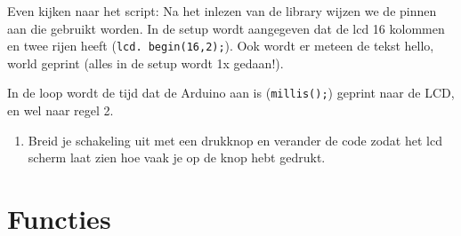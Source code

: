 \documentclass{arduino}
\begin{document}
\begin{minipage}{\widemargin}
Even kijken naar het script: Na het inlezen van de library wijzen we de pinnen aan die gebruikt worden. In de setup wordt aangegeven dat de lcd 16 kolommen en twee rijen heeft (\lstinline{lcd. begin(16,2);}). Ook wordt er meteen de tekst hello, world geprint (alles in de setup wordt 1x gedaan!).

In de loop wordt de tijd dat de Arduino aan is (\lstinline{millis();}) geprint naar de LCD, en wel naar regel 2.

\begin{enumerate}[label={\alph*})]
\item Breid je schakeling uit met een drukknop en verander de code zodat het lcd scherm laat zien hoe vaak je op de knop hebt gedrukt.
\end{enumerate}
\end{minipage}

\newpage

\section{Functies}
\end{document}
